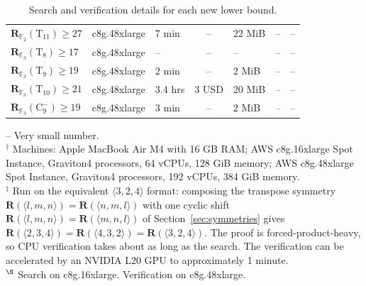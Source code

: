 \documentclass[11pt]{article}
\theoremstyle{definition}
\newcommand{\F}{\mathbb{F}}
\newcommand{\R}{\mathbf{R}}
\newcommand{\Rk}[2]{\mathbf{R}_{#1}(#2)}
\newcommand{\Trunct}[1]{\mathrm{T}_{#1}}
\newcommand{\Negat}[1]{\mathrm{C}^{-}_{#1}}
\newcommand{\mmt}[3]{\langle #1,#2,#3\rangle}
\begin{document}
\begin{table}[!ht]
\begin{tabular}{lllcllc}
    $\Rk{\F_2}{\Trunct{11}}\ge 27$            & c8g.48xlarge             & $7$ min                   & --                        & $22$ MiB                 & --                        & --                        \\
    $\Rk{\F_3}{\Trunct{8}}\ge 17$             & c8g.48xlarge             & --                        & --                        & --                       & --                        & --                        \\
    $\Rk{\F_3}{\Trunct{9}}\ge 19$             & c8g.48xlarge             & $2$ min                   & --                        & $2$ MiB                  & --                        & --                        \\
    $\Rk{\F_3}{\Trunct{10}}\ge 21$            & c8g.48xlarge             & $3.4$ hrs                 & $3$ USD                   & $20$ MiB                 & --                        & --                        \\
    \midrule
    $\Rk{\F_3}{\Negat{9}}\ge 19$              & c8g.48xlarge             & $3$ min                   & --                        & $2$ MiB                  & --                        & --                        \\
    \bottomrule
  \end{tabular}

  \smallskip
  {\footnotesize\raggedright
    -- Very small number.\\
    $^\dagger$ Machines: Apple MacBook Air M4 with 16 GB RAM; AWS c8g.16xlarge Spot
    Instance, Graviton4 processors, 64 vCPUs, 128 GiB memory; AWS c8g.48xlarge Spot
    Instance, Graviton4 processors, 192 vCPUs, 384 GiB memory.\\
    $^\ddagger$ Run on the equivalent $\mmt{3}{2}{4}$ format: composing the
    transpose symmetry $\R(\mmt{l}{m}{n})=\R(\mmt{n}{m}{l})$ with one cyclic shift
    $\R(\mmt{l}{m}{n})=\R(\mmt{m}{n}{l})$ of Section~\ref{sec:symmetries} gives
    $\R(\mmt{2}{3}{4})=\R(\mmt{4}{3}{2})=\R(\mmt{3}{2}{4})$. The proof is
    forced-product-heavy, so CPU verification takes about as long as the search.
    The verification can be accelerated by an NVIDIA L20 GPU to approximately 1 minute.\\
    $^\S$ Search on c8g.16xlarge. Verification on c8g.48xlarge.\\
    \par
  }
  \caption{Search and verification details for each new lower bound.}
  \label{tab:results}
\end{table}
\end{document}
